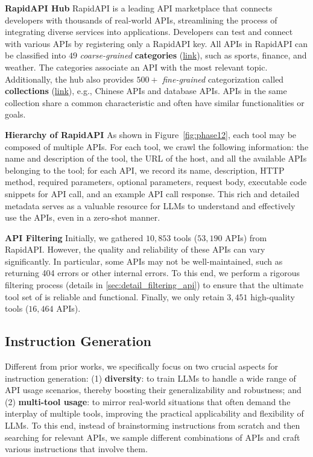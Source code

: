 \textbf{RapidAPI Hub} \quad
RapidAPI is a leading API marketplace that connects developers with thousands of real-world APIs, streamlining the process of integrating diverse services into applications. Developers can test and connect with various APIs by registering only a RapidAPI key. All APIs in RapidAPI can be classified into $49$ \textit{coarse-grained} \textbf{categories} (\textcolor{blue}{\href{https://rapidapi.com/categories}{link}}), such as sports, finance, and weather. 
The categories associate an API with the most relevant topic.
Additionally, the hub also provides $500+$ \textit{fine-grained} categorization called \textbf{collections} (\textcolor{blue}{\href{https://rapidapi.com/collections}{link}}), e.g., Chinese APIs and database APIs. APIs in the same collection share a common characteristic and often have similar functionalities or goals.

\textbf{Hierarchy of RapidAPI} \quad
As shown in Figure~\ref{fig:phase12}, each tool may be composed of multiple APIs. For each tool, we crawl the following information: the name and description of the tool, the URL of the host, and all the available APIs belonging to the tool; for each API, we record its name, description, HTTP method, required parameters, optional parameters, request body, executable code snippets for API call, and an example API call response. This rich and detailed metadata serves as a valuable resource for LLMs to understand and effectively use the APIs, even in a zero-shot manner.

\textbf{API Filtering} \quad
Initially, we gathered $10,853$ tools ($53,190$ APIs) from RapidAPI. However, the quality and reliability of these APIs can vary significantly. In particular, some APIs may not be well-maintained, such as returning 404 errors or other internal errors.
To this end, we perform a rigorous filtering process (details in \cref{sec:detail_filtering_api}) to ensure that the ultimate tool set of \ourdata is reliable and functional.
Finally, we only retain $3,451$ high-quality tools ($16,464$ APIs).

\subsection{Instruction Generation}
\label{sec:instruction_generation}

Different from prior works, we specifically focus on two crucial aspects for instruction generation: (1) \textbf{diversity}: to train LLMs to handle a wide range of API usage scenarios, thereby boosting their generalizability and robustness; and (2) \textbf{multi-tool usage}: to mirror real-world situations that often demand the interplay of multiple tools, improving the practical applicability and flexibility of LLMs. 
To this end, instead of brainstorming instructions from scratch and then searching for relevant APIs, we sample different combinations of APIs and craft various instructions that involve them.

